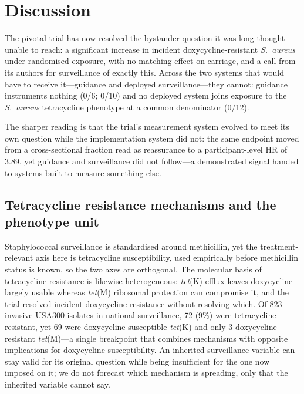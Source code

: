 \documentclass[12pt,a4paper]{article}
\newcommand{\sa}{\emph{S.~aureus}}
\begin{document}
\section*{Discussion}

The pivotal trial has now resolved the bystander question it was long thought
unable to reach: a significant increase in incident doxycycline-resistant \sa{}
under randomised exposure, with no matching effect on carriage, and a call from
its authors for surveillance of exactly this.\cite{luetkemeyer2025} Across the two systems that would have to
receive it---guidance and deployed surveillance---they cannot:
guidance instruments nothing (0/6; 0/10) and no deployed system joins exposure to
the \sa{} tetracycline phenotype at a common denominator (0/12).

The sharper reading is that the trial's measurement system evolved to meet its own
question while the implementation system did not: the same endpoint moved from a
cross-sectional fraction read as reassurance to a participant-level HR of 3.89, yet
guidance and surveillance did not follow\cite{montoya2025estimand}---a demonstrated
signal handed to systems built to measure something else.

\subsection*{Tetracycline resistance mechanisms and the phenotype unit}
Staphylococcal surveillance is standardised around methicillin, yet the
treatment-relevant axis here is tetracycline susceptibility, used empirically
before methicillin status is known, so the two axes are orthogonal. The molecular
basis of tetracycline resistance is likewise heterogeneous: \emph{tet}(K) efflux leaves doxycycline largely
usable whereas \emph{tet}(M) ribosomal protection can compromise it, and the trial
resolved incident doxycycline resistance without resolving
which.\cite{liu2011,grossman2016} Of 823 invasive
USA300 isolates in national surveillance, 72 (9\%) were tetracycline-resistant,
yet 69 were doxycycline-susceptible \emph{tet}(K) and only 3 doxycycline-resistant
\emph{tet}(M)\cite{mcdougal2010}---a single breakpoint that combines mechanisms with opposite implications for
doxycycline susceptibility. An inherited surveillance variable can stay valid for its
original question while being insufficient for the one now imposed on it; we do
not forecast which mechanism is spreading, only that the inherited variable cannot
say.
\end{document}
